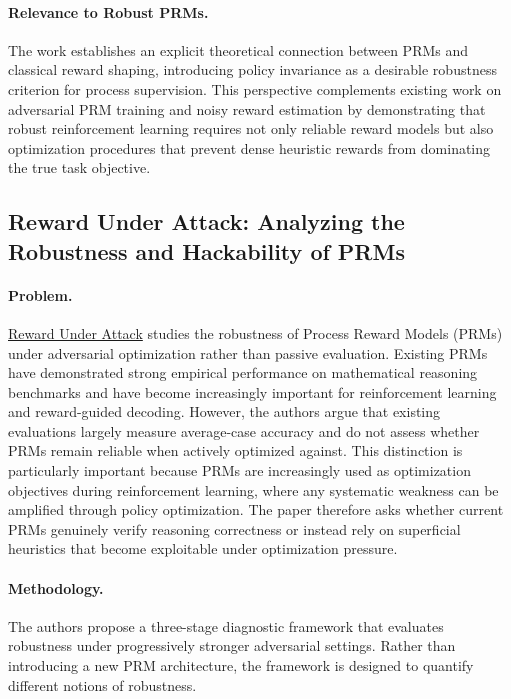 \documentclass[11pt]{article}
\begin{document}
\paragraph{Relevance to Robust PRMs.}
The work establishes an explicit theoretical connection between PRMs and classical reward shaping, introducing policy invariance as a desirable robustness criterion for process supervision. This perspective complements existing work on adversarial PRM training and noisy reward estimation by demonstrating that robust reinforcement learning requires not only reliable reward models but also optimization procedures that prevent dense heuristic rewards from dominating the true task objective.

\subsection{Reward Under Attack: Analyzing the Robustness and Hackability of PRMs}

\paragraph{Problem.}
\href{https://arxiv.org/abs/2603.06621}{Reward Under Attack} studies the robustness of Process Reward Models (PRMs) under adversarial optimization rather than passive evaluation. Existing PRMs have demonstrated strong empirical performance on mathematical reasoning benchmarks and have become increasingly important for reinforcement learning and reward-guided decoding. However, the authors argue that existing evaluations largely measure average-case accuracy and do not assess whether PRMs remain reliable when actively optimized against. This distinction is particularly important because PRMs are increasingly used as optimization objectives during reinforcement learning, where any systematic weakness can be amplified through policy optimization. The paper therefore asks whether current PRMs genuinely verify reasoning correctness or instead rely on superficial heuristics that become exploitable under optimization pressure.

\paragraph{Methodology.}
The authors propose a three-stage diagnostic framework that evaluates robustness under progressively stronger adversarial settings. Rather than introducing a new PRM architecture, the framework is designed to quantify different notions of robustness.
\end{document}
